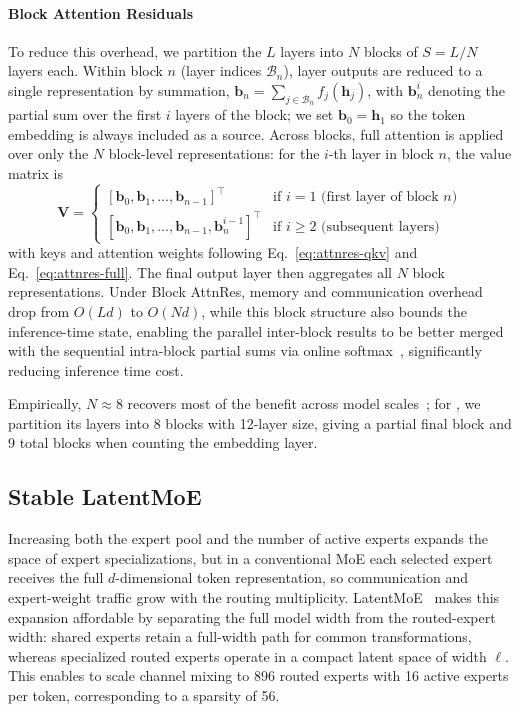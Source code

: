 \paragraph{Block Attention Residuals} To reduce this overhead, we partition the $L$ layers into $N$ blocks of $S = L/N$ layers each. Within block $n$ (layer indices $\mathcal{B}_n$), layer outputs are reduced to a single representation by summation, $\bm{b}_n = \sum_{j \in \mathcal{B}_n} f_j(\bm{h}_j)$, with $\bm{b}_n^i$ denoting the partial sum over the first $i$ layers of the block; we set $\bm{b}_0 = \bm{h}_1$ so the token embedding is always included as a source. Across blocks, full attention is applied over only the $N$ block-level representations: for the $i$-th layer in block $n$, the value matrix is
\begin{equation}
    \mathbf{V} = \begin{cases}
        [\bm{b}_0, \bm{b}_1, \ldots, \bm{b}_{n-1}]^\top                 & \text{if } i = 1 \text{ (first layer of block } n\text{)} \\
        [\bm{b}_0, \bm{b}_1, \ldots, \bm{b}_{n-1}, \bm{b}_n^{i-1}]^\top & \text{if } i \geq 2 \text{ (subsequent layers)}
    \end{cases}
    \label{eq:attnres-block}
\end{equation}
with keys and attention weights following Eq.~\ref{eq:attnres-qkv} and Eq.~\ref{eq:attnres-full}. The final output layer then aggregates all $N$ block representations. Under Block AttnRes, memory and communication overhead drop from $O(Ld)$ to $O(Nd)$, while this block structure also bounds the inference-time state, enabling the parallel inter-block results to be better merged with the sequential intra-block partial sums via online softmax~\citep{milakov2018online}, significantly reducing inference time cost.

Empirically, $N \approx 8$ recovers most of the benefit across model scales~\citep{kimiteam2026attnres}; for , we partition its layers into 8 blocks with 12-layer size, giving a partial final block and 9 total blocks when counting the embedding layer.


\subsection{Stable LatentMoE}
\label{sec:stable-latent-moe}

Increasing both the expert pool and the number of active experts expands the space of expert specializations, but in a conventional MoE each selected expert receives the full $d$-dimensional token representation, so communication and expert-weight traffic grow with the routing multiplicity.
LatentMoE~\citep{elango2026latentmoe} makes this expansion affordable by separating the full model width from the routed-expert width: shared experts retain a full-width path for common transformations, whereas specialized routed experts operate in a compact latent space of width $\ell$. This enables  to scale channel mixing to 896 routed experts with 16 active experts per token, corresponding to a sparsity of 56.

